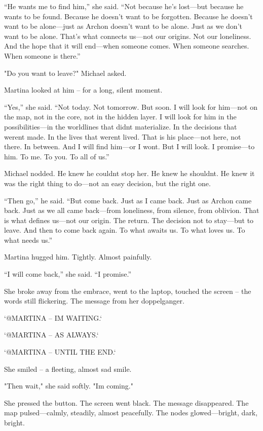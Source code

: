 \documentclass[
]{article}
\begin{document}
``He wants me to find him,'' she said. ``Not because he's lost---but because he wants to be found. Because he doesn't want to be forgotten. Because he doesn't want to be alone---just as Archon doesn't want to be alone. Just as we don't want to be alone. That's what connects us---not our origins. Not our loneliness. And the hope that it will end---when someone comes. When someone searches. When someone is there.''

"Do you want to leave?" Michael asked.

Martina looked at him -- for a long, silent moment.

``Yes,'' she said. ``Not today. Not tomorrow. But soon. I will look for him---not on the map, not in the core, not in the hidden layer. I will look for him in the possibilities---in the worldlines that didn\textquotesingle t materialize. In the decisions that weren\textquotesingle t made. In the lives that weren\textquotesingle t lived. That is his place---not here, not there. In between. And I will find him---or I won\textquotesingle t. But I will look. I promise---to him. To me. To you. To all of us.''

Michael nodded. He knew he couldn\textquotesingle t stop her. He knew he shouldn\textquotesingle t. He knew it was the right thing to do---not an easy decision, but the right one.

``Then go,'' he said. ``But come back. Just as I came back. Just as Archon came back. Just as we all came back---from loneliness, from silence, from oblivion. That is what defines us---not our origin. The return. The decision not to stay---but to leave. And then to come back again. To what awaits us. To what loves us. To what needs us.''

Martina hugged him. Tightly. Almost painfully.

``I will come back,'' she said. ``I promise.''

She broke away from the embrace, went to the laptop, touched the screen -- the words still flickering. The message from her doppelganger.

`@MARTINA -- I\textquotesingle M WAITING.`

`@MARTINA -- AS ALWAYS.`

`@MARTINA -- UNTIL THE END.`

She smiled -- a fleeting, almost sad smile.

"Then wait," she said softly. "I\textquotesingle m coming."

She pressed the button. The screen went black. The message disappeared. The map pulsed---calmly, steadily, almost peacefully. The nodes glowed---bright, dark, bright.
\end{document}
